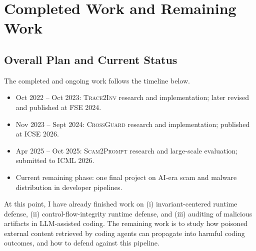 \section{Completed Work and Remaining Work}



\subsection{Overall Plan and Current Status}

The completed and ongoing work follows the timeline below.
\begin{itemize}
	\item Oct 2022 -- Oct 2023: \textsc{Trace2Inv} research and implementation;
	later revised and published at FSE 2024.
	\item Nov 2023 -- Sept 2024: \textsc{CrossGuard} research and implementation;
	published at ICSE 2026.
	\item Apr 2025 -- Oct 2025: \textsc{Scam2Prompt} research and large-scale evaluation;
	submitted to ICML 2026.
	\item Current remaining phase: one final project on AI-era scam and malware 
	distribution in developer pipelines.
\end{itemize}

At this point, I have already finished work on
(i) invariant-centered runtime defense,
(ii) control-flow-integrity runtime defense, and
(iii) auditing of malicious artifacts in LLM-assisted coding.
The remaining work is to study how poisoned external content 
retrieved by coding agents 
can propagate into harmful coding outcomes, and how to 
defend against this pipeline.


